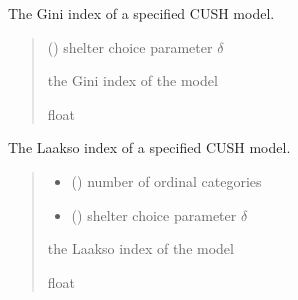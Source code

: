 \documentclass[letterpaper,10pt,english]{sphinxmanual}
\begin{document}

\begin{fulllineitems}
\label{\detokenize{cubmods:cubmods.cush.gini}}
\pysigstartsignatures
{}
\pysigstopsignatures
\sphinxAtStartPar
The Gini index of a specified CUSH model.
\begin{quote}\begin{description}
\sphinxAtStartPar
{} () \textendash{} shelter choice parameter \(\delta\)

\sphinxAtStartPar
the Gini index of the model

\sphinxAtStartPar
float

\end{description}\end{quote}

\end{fulllineitems}


\begin{fulllineitems}
\label{\detokenize{cubmods:cubmods.cush.laakso}}
\pysigstartsignatures
{}
\pysigstopsignatures
\sphinxAtStartPar
The Laakso index of a specified CUSH model.
\begin{quote}\begin{description}
\begin{itemize}
\item {} 
\sphinxAtStartPar
{} () \textendash{} number of ordinal categories

\item {} 
\sphinxAtStartPar
{} () \textendash{} shelter choice parameter \(\delta\)

\end{itemize}

\sphinxAtStartPar
the Laakso index of the model

\sphinxAtStartPar
float

\end{description}\end{quote}

\end{fulllineitems}
\end{document}
